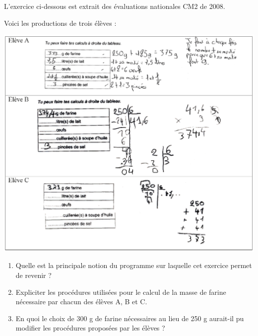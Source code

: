 \begin{exercice}[CRPE 2017 G1]
L’exercice ci-dessous est extrait des évaluations nationales CM2 de 2008.
\begin{center}
\end{center}
Voici les productions de trois élèves :
\begin{center}
   \includegraphics[width=15cm]{Transversal/Images/Tra8_analyse_crepes}
\end{center}
\begin{enumerate}
   \item Quelle est la principale notion du programme sur laquelle cet exercice permet de revenir ?
   \item Expliciter les procédures utilisées pour le calcul de la masse de farine nécessaire par chacun des élèves A, B et C.
   \item En quoi le choix de 300 g de farine nécessaires au lieu de 250 g aurait-il pu modifier les procédures proposées par les élèves ?
\end{enumerate}
\end{exercice}

